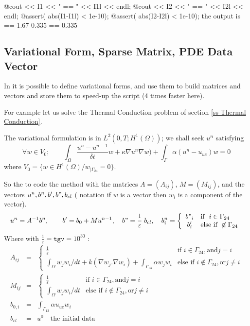 \documentclass[a4paper,twoside,12pt]{book}
\def\n{\nabla}
\begin{document}
  @cout << I1 << " == " << I1l << endl; 
  @cout << I2 << " == " << I2l << endl; 
  @assert( abs(I1-I1l) < 1e-10);
  @assert( abs(I2-I2l) < 1e-10);
\eFF
the output is
 == 1.67
0.335 == 0.335
\eFF

\subsection{Variational Form, Sparse Matrix, PDE Data Vector}
 In \freefempp it is possible to define variational forms, and use them to build matrices
  and vectors and store them to speed-up the script (4 times faster here).

  For example let us solve the Thermal Conduction problem of section \ref{ss Thermal Conduction}.

 The variational formulation is  in $L^2(0,T;H^1(\Omega))$;
  we shall seek $u^n$ satisfying
\[
\forall w \in V_{0}; \qquad   \int_\Omega \frac{u^n-u^{n-1}}{\delta t} w + \kappa\n u^n\n w) +\int_\Gamma\alpha(u^n-u_{ue})w=0
\]
where $ V_0 = \{w\in H^1(\Omega)/ w_{|\Gamma_{24}}=0\}$.

So the to code the method with the matrices $A=(A_{ij})$, $M=(M_{ij})$, and  the vectors
$ u^n, b^n, b',b", b_{cl}$
( notation if $w$ is a vector then $w_i$ is a component of the vector).
\def\tgv{{\frac{1}{\varepsilon}}}
\begin{equation} u^n = A^{-1} b^n, \quad
  \quad b' = b_0 + M u^{n-1},
  \quad b"=  \tgv \; b_{cl} ,
  \quad  b^n_i = \left\{
  \begin{array}{cl}   b"_i  & \mbox{if }\ i \in \Gamma_{24} \\
                       b'_i & \mbox{else if } \not\in \Gamma_{24} \end{array}\right.
                       \label{eq tgv}  \end{equation}
Where with $ \tgv = \mathtt{tgv} = 10^{30}$ :
\begin{eqnarray}
 A_{ij} &=& \left\{\begin{array}{cl}   \tgv  & \mbox{if } i  \in \Gamma_{24}, \mbox{and}  j=i \\
\displaystyle
 \int_{\Omega} w_j w_i / dt + k (\nabla w_j. \nabla w_i ) + \int_{\Gamma_{13}} \alpha w_j w_i & \mbox{else if }  i  \not\in \Gamma_{24}, \mbox{or}  j\ne i
 \end{array}\right.  \\
 M_{ij} &=& \left\{\begin{array}{cl}   \tgv & \mbox{if } i  \in \Gamma_{24}, \mbox{and}  j=i  \\
\displaystyle
 \int_{\Omega} w_j w_i / dt
 & \mbox{else if }i  \not\in \Gamma_{24}, \mbox{or}  j\ne i   \end{array}\right. \\
 b_{0,i} &=& \int_{\Gamma_{13}} \alpha u_{ue} w_i  \\
 b_{cl} &=& u^{0}  \quad \mbox{the initial data}
\end{eqnarray}
\end{document}
